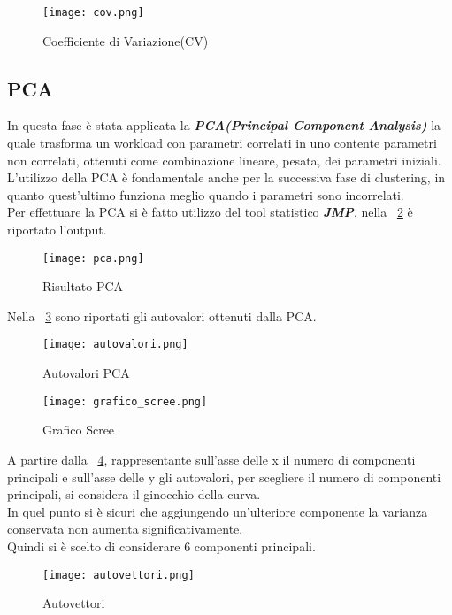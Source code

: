 \begin{figure}[!htbp]
	\texttt{[image: cov.png]}
  \caption{Coefficiente di Variazione(CV)}
  \label{}
\end{figure}
\clearpage

\subsection{PCA}
In questa fase è stata applicata la
\textbf{\textit{PCA(Principal Component Analysis)}}
la quale trasforma un workload con parametri correlati in uno contente parametri
non correlati, ottenuti come combinazione lineare, pesata, dei parametri iniziali.\\
L'utilizzo della PCA è fondamentale anche per la successiva fase di clustering, in
quanto quest'ultimo funziona meglio quando i parametri sono incorrelati.\\
Per effettuare la PCA si è fatto utilizzo del tool statistico \textit{\textbf{JMP}}, nella
\figurename~\ref{pca} è riportato l'output.\\

\begin{figure}[!htbp]
	\texttt{[image: pca.png]}
  \caption{Risultato PCA}
  \label{pca}
\end{figure}

\clearpage

Nella \figurename~\ref{autovalori} sono riportati gli autovalori ottenuti dalla PCA.\\

\begin{figure}[!htbp]
	\texttt{[image: autovalori.png]}
  \caption{Autovalori PCA}
  \label{autovalori}
\end{figure}

\clearpage

\begin{figure}[!htbp]
	\texttt{[image: grafico\_scree.png]}
  \caption{Grafico Scree}
  \label{grafico_scree}
\end{figure}

A partire dalla \figurename~\ref{grafico_scree}, rappresentante
sull'asse delle x il numero di componenti principali e sull'asse delle y
gli autovalori, per scegliere il numero di componenti principali, si considera
il ginocchio della curva.\\
In quel punto si è sicuri che aggiungendo un'ulteriore componente la varianza
conservata non aumenta significativamente.\\
Quindi si è scelto di considerare 6 componenti principali.\\
\clearpage
\begin{figure}[!htbp]
	\texttt{[image: autovettori.png]}
  \caption{Autovettori}
  \label{autovettori}
\end{figure}


